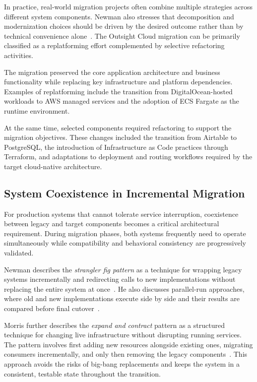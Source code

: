 In practice, real-world migration projects often combine multiple strategies across different system components. Newman also stresses that decomposition and modernization choices should be driven by the desired outcome rather than by technical convenience alone~\cite{newman2021building}. The Outsight Cloud migration can be primarily classified as a replatforming effort complemented by selective refactoring activities.

The migration preserved the core application architecture and business functionality while replacing key infrastructure and platform dependencies. Examples of replatforming include the transition from DigitalOcean-hosted workloads to AWS managed services and the adoption of ECS Fargate as the runtime environment.

At the same time, selected components required refactoring to support the migration objectives. These changes included the transition from Airtable to PostgreSQL, the introduction of Infrastructure as Code practices through Terraform, and adaptations to deployment and routing workflows required by the target cloud-native architecture.

\subsection{System Coexistence in Incremental Migration}
For production systems that cannot tolerate service interruption, coexistence between legacy and target components becomes a critical architectural requirement. During migration phases, both systems frequently need to operate simultaneously while compatibility and behavioral consistency are progressively validated.

Newman describes the \emph{strangler fig pattern} as a technique for wrapping legacy systems incrementally and redirecting calls to new implementations without replacing the entire system at once~\cite{newman2021building}. He also discusses parallel-run approaches, where old and new implementations execute side by side and their results are compared before final cutover~\cite{newman2021building}.

Morris further describes the \emph{expand and contract} pattern as a structured technique for changing live infrastructure without disrupting running services. The pattern involves first adding new resources alongside existing ones, migrating consumers incrementally, and only then removing the legacy components~\cite{morris2021iac}. This approach avoids the risks of big-bang replacements and keeps the system in a consistent, testable state throughout the transition.

